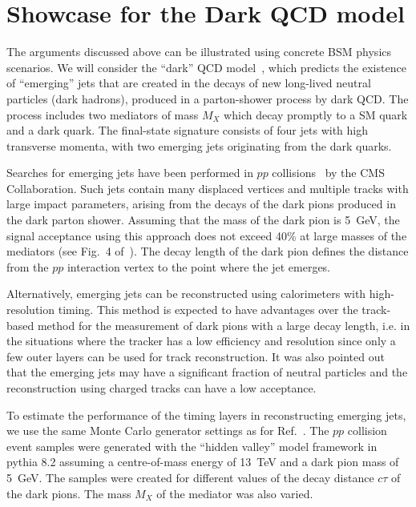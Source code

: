 \section{Showcase for the Dark QCD model}
\label{darksec}

The arguments discussed above can be illustrated using concrete BSM physics scenarios.
We will consider the ``dark'' QCD model~\cite{Bai:2013xga,Schwaller:2015gea}, which predicts 
the existence of ``emerging'' jets 
that are created in the decays of new long-lived neutral 
particles (dark hadrons), produced in a parton-shower process by dark QCD.
The process includes  two mediators of mass $M_X$ which 
decay promptly to a SM quark and a dark quark. 
The final-state signature consists of four jets with high transverse momenta, with two  
 emerging jets originating from the dark quarks.  

Searches for emerging jets have been performed in $pp$ collisions~\cite{Sirunyan:2018njd} 
by the CMS Collaboration. Such jets contain many displaced
 vertices and multiple tracks with large impact parameters, arising from the decays of the dark pions produced in the dark parton shower.
 Assuming that the mass of the dark pion is 5~GeV,  the signal acceptance using this approach does not exceed 40\% at large masses of the mediators
(see Fig.~4 of~\cite{Sirunyan:2018njd}).
The decay length of the dark pion defines the distance from the $pp$ interaction vertex 
to the point where the jet emerges. 

Alternatively, emerging jets can be reconstructed using calorimeters with high-resolution timing. This method is expected
to have advantages over the track-based method 
for the measurement of dark pions with a large decay length, i.e. in the situations where the tracker has a low
 efficiency and resolution since only a few outer layers can be used for track reconstruction.
It was also pointed out~\cite{Schwaller:2015gea} that the emerging jets may have a significant fraction of neutral particles and the reconstruction
using charged tracks can have a low acceptance.

To estimate the performance of the timing layers in reconstructing emerging jets,
we use the same Monte Carlo generator settings as for Ref.~\cite{Sirunyan:2018njd}. 
The $pp$ collision event samples  were  generated with the ``hidden valley'' model framework in {\sc pythia} 8.2 assuming a centre-of-mass energy 
 of 13~TeV and a dark pion mass of 5~GeV. The samples were created for different values of the decay distance $c\tau$ of the dark pions.  
The  mass $M_X$ of the mediator was also varied. 

